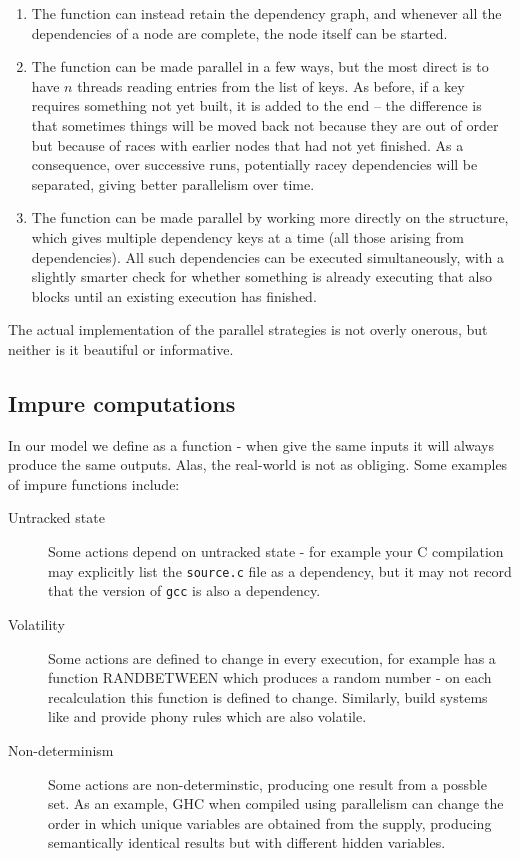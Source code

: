 \begin{enumerate}
\item The  function can instead retain the dependency graph, and whenever all the dependencies of a node are complete, the node itself can be started.
\item The  function can be made parallel in a few ways, but the most direct is to have $n$ threads reading entries from the list of keys. As before, if a key requires something not yet built, it is added to the end -- the difference is that sometimes things will be moved back not because they are out of order but because of races with earlier nodes that had not yet finished. As a consequence, over successive runs, potentially racey dependencies will be separated, giving better parallelism over time.
\item The  function can be made parallel by working more directly on the  structure, which gives multiple dependency keys at a time (all those arising from  dependencies). All such dependencies can be executed simultaneously, with a slightly smarter check for whether something is already executing that also blocks until an existing execution has finished.
\end{enumerate}

The actual implementation of the parallel strategies is not overly onerous, but neither is it beautiful or informative.

\subsection{Impure computations}\label{sec-non-determinism}

In our model we define  as a function - when give the same inputs it will always produce the same outputs. Alas, the real-world is not as obliging. Some examples of impure  functions include:

\begin{description}
\item[Untracked state] Some actions depend on untracked state - for example your C compilation may explicitly list the \texttt{source.c} file as a dependency, but it may not record that the version of \texttt{gcc} is also a dependency.
\item[Volatility] Some actions are defined to change in every execution, for example \Excel has a function \textsf{RANDBETWEEN} which produces a random number - on each recalculation this function is defined to change. Similarly, build systems like \Make and \Shake provide \textsf{phony} rules which are also volatile.
\item[Non-determinism] Some actions are non-determinstic, producing one result from a possble set. As an example, GHC when compiled using parallelism can change the order in which unique variables are obtained from the supply, producing semantically identical results but with different hidden variables.
\end{description}

